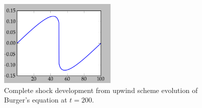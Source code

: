 \documentclass[11pt,letterpaper]{article}
\begin{document}
\begin{figure}[bth]
\centering
\includegraphics[width=0.5\textwidth]{t=145.png}
\caption{Complete shock development from upwind scheme evolution of Burger's
equation at $t=200$.}
\label{fig:3}
\end{figure}
\end{document}
